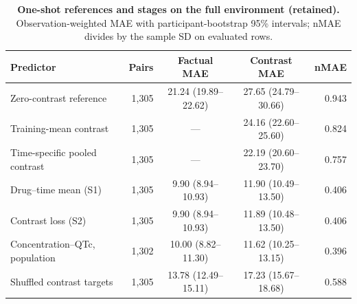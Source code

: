\documentclass[11pt,a4paper]{article}
\begin{document}
\begin{table}[!htbp]\centering\footnotesize
\caption{\textbf{One-shot references and stages on the full environment (retained).} Observation-weighted MAE with participant-bootstrap 95\% intervals; nMAE divides by the sample SD on evaluated rows.}
\begin{tabularx}{\textwidth}{@{}Y r c c r@{}}\toprule
Predictor & Pairs & Factual MAE & Contrast MAE & nMAE\\\midrule
Zero-contrast reference & 1,305 & 21.24 (19.89--22.62) & 27.65 (24.79--30.66) & 0.943\\
Training-mean contrast & 1,305 & --- & 24.16 (22.60--25.60) & 0.824\\
Time-specific pooled contrast & 1,305 & --- & 22.19 (20.60--23.70) & 0.757\\
Drug--time mean (S1) & 1,305 & 9.90 (8.94--10.93) & 11.90 (10.49--13.50) & 0.406\\
Contrast loss (S2) & 1,305 & 9.90 (8.94--10.93) & 11.89 (10.48--13.50) & 0.406\\
Concentration--QTc, population & 1,302 & 10.00 (8.82--11.30) & 11.62 (10.25--13.15) & 0.396\\
Shuffled contrast targets & 1,305 & 13.78 (12.49--15.11) & 17.23 (15.67--18.68) & 0.588\\
\bottomrule\end{tabularx}
\end{table}
\FloatBarrier
\end{document}
